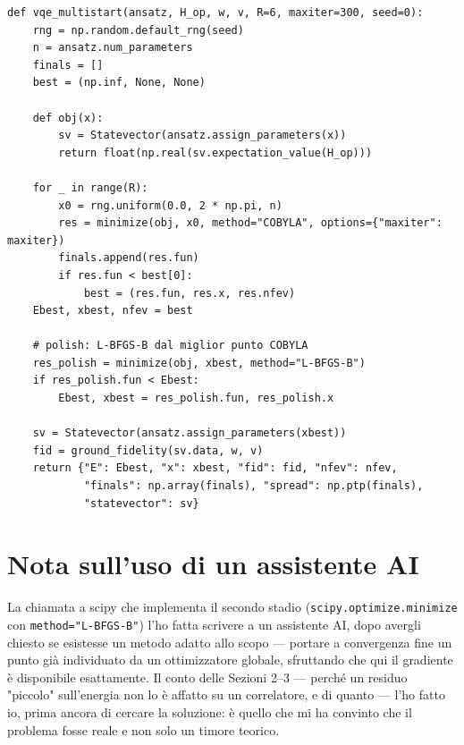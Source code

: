\documentclass[11pt,a4paper]{article}
\begin{document}
\begin{verbatim}
def vqe_multistart(ansatz, H_op, w, v, R=6, maxiter=300, seed=0):
    rng = np.random.default_rng(seed)
    n = ansatz.num_parameters
    finals = []
    best = (np.inf, None, None)

    def obj(x):
        sv = Statevector(ansatz.assign_parameters(x))
        return float(np.real(sv.expectation_value(H_op)))

    for _ in range(R):
        x0 = rng.uniform(0.0, 2 * np.pi, n)
        res = minimize(obj, x0, method="COBYLA", options={"maxiter": maxiter})
        finals.append(res.fun)
        if res.fun < best[0]:
            best = (res.fun, res.x, res.nfev)
    Ebest, xbest, nfev = best

    # polish: L-BFGS-B dal miglior punto COBYLA
    res_polish = minimize(obj, xbest, method="L-BFGS-B")
    if res_polish.fun < Ebest:
        Ebest, xbest = res_polish.fun, res_polish.x

    sv = Statevector(ansatz.assign_parameters(xbest))
    fid = ground_fidelity(sv.data, w, v)
    return {"E": Ebest, "x": xbest, "fid": fid, "nfev": nfev,
            "finals": np.array(finals), "spread": np.ptp(finals),
            "statevector": sv}
\end{verbatim}

\section{Nota sull'uso di un assistente AI}

La chiamata a scipy che implementa il secondo stadio (\texttt{scipy.optimize.minimize} con \texttt{method="L-BFGS-B"}) l'ho fatta scrivere a un assistente AI, dopo avergli chiesto se esistesse un metodo adatto allo scopo — portare a convergenza fine un punto già individuato da un ottimizzatore globale, sfruttando che qui il gradiente è disponibile esattamente. Il conto delle Sezioni 2--3 — perché un residuo "piccolo" sull'energia non lo è affatto su un correlatore, e di quanto — l'ho fatto io, prima ancora di cercare la soluzione: è quello che mi ha convinto che il problema fosse reale e non solo un timore teorico.
\end{document}
